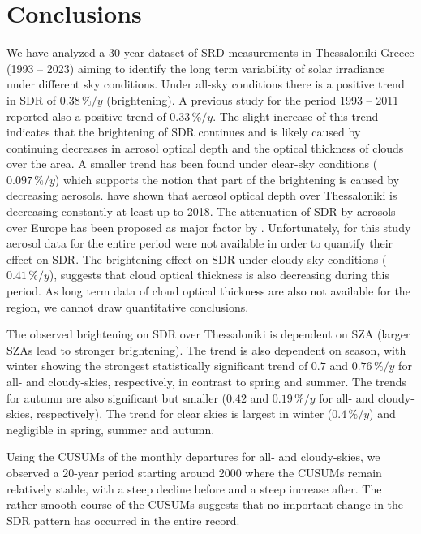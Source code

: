 \documentclass[applsci,article,submit,moreauthors,pdftex]{Definitions/mdpi}
\begin{document}
\hypertarget{conclusions}{%
\section{Conclusions}\label{conclusions}}

We have analyzed a 30-year dataset of SRD measurements in Thessaloniki
Greece (1993 -- 2023) aiming to identify the long term variability of
solar irradiance under different sky conditions. Under all-sky
conditions there is a positive trend in SDR of \(0.38\,\%/y\)
(brightening). A previous study \citep{Bais2013} for the period 1993 --
2011 reported also a positive trend of \(0.33\,\%/y\). The slight
increase of this trend indicates that the brightening of SDR continues
and is likely caused by continuing decreases in aerosol optical depth
and the optical thickness of clouds over the area. A smaller trend has
been found under clear-sky conditions (\(0.097\,\%/y\)) which supports
the notion that part of the brightening is caused by decreasing
aerosols. \citet{Siomos2020} have shown that aerosol optical depth over
Thessaloniki is decreasing constantly at least up to 2018. The
attenuation of SDR by aerosols over Europe has been proposed as major
factor by \citet{Wild2021}. Unfortunately, for this study aerosol data
for the entire period were not available in order to quantify their
effect on SDR. The brightening effect on SDR under cloudy-sky conditions
(\(0.41\,\%/y\)), suggests that cloud optical thickness is also
decreasing during this period. As long term data of cloud optical
thickness are also not available for the region, we cannot draw
quantitative conclusions.

The observed brightening on SDR over Thessaloniki is dependent on SZA
(larger SZAs lead to stronger brightening). The trend is also dependent
on season, with winter showing the strongest statistically significant
trend of \(0.7\) and \(0.76\,\%/y\) for all- and cloudy-skies,
respectively, in contrast to spring and summer. The trends for autumn
are also significant but smaller (\(0.42\) and \(0.19\,\%/y\) for all-
and cloudy-skies, respectively). The trend for clear skies is largest in
winter (\(0.4\,\%/y\)) and negligible in spring, summer and autumn.

Using the CUSUMs of the monthly departures for all- and cloudy-skies, we
observed a 20-year period starting around 2000 where the CUSUMs remain
relatively stable, with a steep decline before and a steep increase
after. The rather smooth course of the CUSUMs suggests that no important
change in the SDR pattern has occurred in the entire record.
\end{document}
